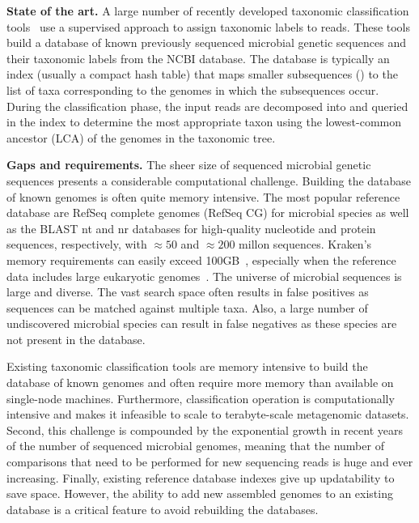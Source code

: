 \noindent
{\bf State of the art.}
A large number of recently developed taxonomic classification tools~\cite{ames2013scalable, kim2016centrifuge, menzel2016fast, wood2014kraken, wood2019improved, dilthey2019strain,liu2018novel} use a supervised approach to assign taxonomic labels to reads. 
These tools build a database of known previously sequenced microbial genetic sequences and their taxonomic labels from the NCBI database.
The database is typically an index (usually a compact hash table) that maps smaller subsequences (\kmers) to the list of taxa corresponding to the genomes in which the subsequences occur.
During the classification phase, the input reads are decomposed into \kmers and queried in the index to determine the most appropriate taxon using the lowest-common ancestor (LCA) of the genomes in the taxonomic tree.

\noindent
{\bf Gaps and requirements.}
The sheer size of sequenced microbial genetic sequences presents a considerable computational challenge.
Building the database of known genomes is often quite memory intensive.
The most popular reference database are RefSeq complete genomes (RefSeq CG) for microbial species as well as the BLAST nt and nr databases for high-quality nucleotide and protein sequences, respectively, with $\approx50$ and $\approx200$ millon sequences.
Kraken's~\cite{wood2014kraken} memory requirements can easily exceed 100GB~\cite{simon2019benchmarking}, especially when the reference data includes large eukaryotic genomes~\cite{meiser2017sequencing, knutson2017porcine}.
%
The universe of microbial sequences is large and diverse. The vast search space often results in false positives as sequences can be matched against multiple taxa. Also, a large number of undiscovered microbial species can result in false negatives as these species are not present in the database.

Existing taxonomic classification tools are memory intensive to build the database of known genomes and often require more memory than available on single-node machines. Furthermore, classification operation is computationally intensive and makes it infeasible to scale to terabyte-scale metagenomic datasets.
Second, this challenge is compounded by the exponential growth in recent years of the number of sequenced microbial genomes, meaning that the number of comparisons that need to be performed for new sequencing reads is huge and ever increasing.
%
Finally, existing reference database indexes give up updatability to save space. However, the ability to add new assembled genomes to an existing database is a critical feature to avoid rebuilding the databases. 



